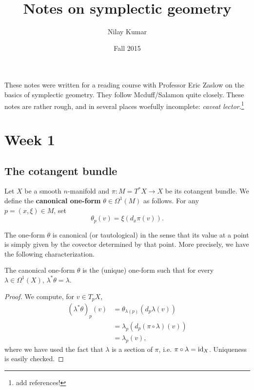 \documentclass{amsart}
\title{Notes on symplectic geometry}
\author{Nilay Kumar}
\date{Fall 2015}
\begin{document}
\maketitle
\tableofcontents

These notes were written for a reading course with Professor Eric Zaslow on
the basics of symplectic geometry. They follow Mcduff/Salamon quite closely.
These notes are rather rough, and in several places woefully incomplete: \textit{caveat lector}.\footnote{add references!}

\section{Week 1}

\subsection{The cotangent bundle}

\begin{definition}
Let $X$ be a smooth $n$-manifold and $\pi:M=T^*X\to X$ be its cotangent bundle. We define the
\textbf{canonical one-form} $\theta\in\Omega^1(M)$ as follows. For any $p=(x,\xi)\in M$,
set
\begin{equation*}
    \theta_p(v)=\xi( d_x\pi(v)).
\end{equation*}
\end{definition}

The one-form $\theta$ is canonical (or tautological) in the sense that its value at a point
is simply given by the covector determined by that point. More precisely, we have the following
characterization.

\begin{proposition}
    The canonical one-form $\theta$ is the (unique) one-form such that for every $\lambda\in\Omega^1(X)$,
    $\lambda^*\theta=\lambda$.
    \label{prop:can}
\end{proposition}
\begin{proof}
    We compute, for $v\in T_pX$,
    \begin{align*}
        (\lambda^*\theta)_p(v) &= \theta_{\lambda(p)}(d_p\lambda(v)) \\
        &= \lambda_p(d_p(\pi\circ\lambda)(v)) \\
        &= \lambda_p(v),
    \end{align*}
    where we have used the fact that $\lambda$ is a section of $\pi$, i.e. $\pi\circ\lambda=\operatorname{id}_X$.
    Uniqueness is easily checked.
\end{proof}
\end{document}
